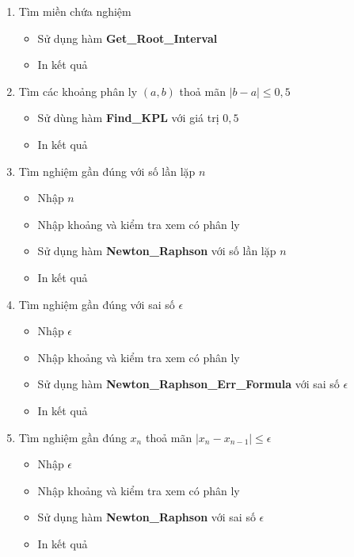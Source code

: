 \begin{enumerate}
\def\labelenumi{\arabic{enumi}.}
\itemsep1pt\parskip0pt
\item
  Tìm miền chứa nghiệm

  \begin{itemize}
  \itemsep1pt\parskip0pt
  \item
    Sử dụng hàm \textbf{Get\_Root\_Interval}
  \item
    In kết quả
  \end{itemize}
\item
  Tìm các khoảng phân ly $(a,b)$ thoả mãn $|b-a| \leq 0,5$

  \begin{itemize}
  \itemsep1pt\parskip0pt
  \item
    Sử dùng hàm \textbf{Find\_KPL} với giá trị $0,5$
  \item
    In kết quả
  \end{itemize}
\item
  Tìm nghiệm gần đúng với số lần lặp $n$

  \begin{itemize}
  \itemsep1pt\parskip0pt
  \item
    Nhập $n$
  \item
    Nhập khoảng và kiểm tra xem có phân ly
  \item
    Sử dụng hàm \textbf{Newton\_Raphson} với số lần lặp $n$
  \item
    In kết quả
  \end{itemize}
\item
  Tìm nghiệm gần đúng với sai số $\epsilon$

  \begin{itemize}
  \itemsep1pt\parskip0pt
  \item
    Nhập $\epsilon$
  \item
    Nhập khoảng và kiểm tra xem có phân ly
  \item
    Sử dụng hàm \textbf{Newton\_Raphson\_Err\_Formula} với sai số
    $\epsilon$
  \item
    In kết quả
  \end{itemize}
\item
  Tìm nghiệm gần đúng $x_n$ thoả mãn $|x_n -x_{n-1}|\leq \epsilon$

  \begin{itemize}
  \itemsep1pt\parskip0pt
  \item
    Nhập $\epsilon$
  \item
    Nhập khoảng và kiểm tra xem có phân ly
  \item
    Sử dụng hàm \textbf{Newton\_Raphson} với sai số $\epsilon$
  \item
    In kết quả
  \end{itemize}
\end{enumerate}

